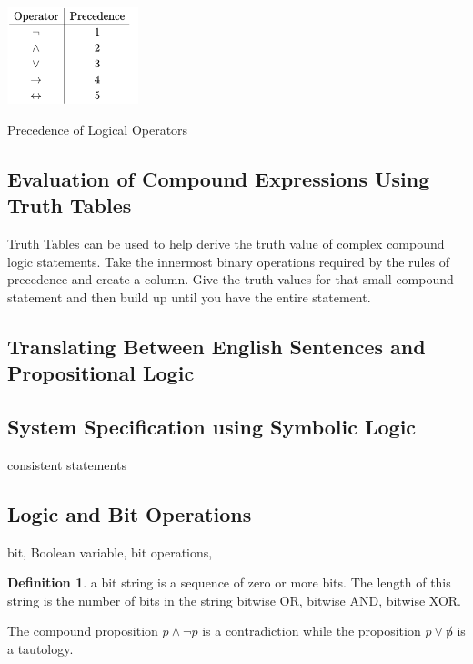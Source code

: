 \documentclass[11pt]{book} %
\theoremstyle {definition}
\newtheorem {definition}{Definition}[section]
\theoremstyle {remark}
\begin{document}
\begin{table}[htbp]
   \centering
  
   \includegraphics [width=1.5in]{PrecedenceOfLogicalOperators}
   \caption{Precedence of Logical Operators}
   \label{table:precedenceOfLogicalOperators}
\end{table}






     \subsection{Evaluation of Compound Expressions Using Truth Tables}
      Truth Tables can be used to help derive the truth value of complex compound logic statements. Take the innermost binary operations required by the rules of precedence and create a column. Give the truth values for that small compound statement and then build up until you have the entire statement. 

    \subsection {Translating Between English Sentences and Propositional Logic}

    \subsection {System Specification using Symbolic Logic}
consistent statements

    \subsection {Logic and Bit Operations}
bit, Boolean variable, bit operations, 

\begin {definition}
a bit string is a sequence of zero or more bits. The length of this string is the number of bits in the string
bitwise OR, bitwise AND, bitwise XOR.
\end {definition}
The compound proposition $p \land \lnot p$ is a contradiction while the proposition $p \lor \not p$ is a tautology.
\end{document}
